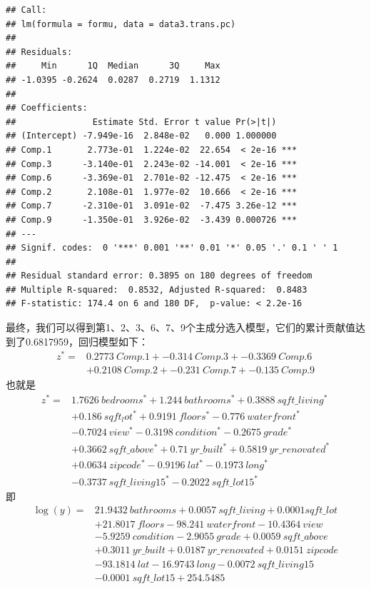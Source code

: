 \documentclass[]{article}
\begin{document}
\begin{verbatim}
## Call:
## lm(formula = formu, data = data3.trans.pc)
## 
## Residuals:
##     Min      1Q  Median      3Q     Max 
## -1.0395 -0.2624  0.0287  0.2719  1.1312 
## 
## Coefficients:
##               Estimate Std. Error t value Pr(>|t|)    
## (Intercept) -7.949e-16  2.848e-02   0.000 1.000000    
## Comp.1       2.773e-01  1.224e-02  22.654  < 2e-16 ***
## Comp.3      -3.140e-01  2.243e-02 -14.001  < 2e-16 ***
## Comp.6      -3.369e-01  2.701e-02 -12.475  < 2e-16 ***
## Comp.2       2.108e-01  1.977e-02  10.666  < 2e-16 ***
## Comp.7      -2.310e-01  3.091e-02  -7.475 3.26e-12 ***
## Comp.9      -1.350e-01  3.926e-02  -3.439 0.000726 ***
## ---
## Signif. codes:  0 '***' 0.001 '**' 0.01 '*' 0.05 '.' 0.1 ' ' 1
## 
## Residual standard error: 0.3895 on 180 degrees of freedom
## Multiple R-squared:  0.8532, Adjusted R-squared:  0.8483 
## F-statistic: 174.4 on 6 and 180 DF,  p-value: < 2.2e-16
\end{verbatim}

最终，我们可以得到第1、2、3、6、7、9个主成分选入模型，它们的累计贡献值达到了0.6817959，回归模型如下：
\begin{align*}
z^* = & 0.2773\ Comp.1 + -0.314\ Comp.3 + -0.3369\ Comp.6 \\
& + 0.2108\ Comp.2 + -0.231\ Comp.7 + -0.135\ Comp.9
\end{align*}
也就是
\begin{align*}
z^* = & 1.7626\ bedrooms^* + 1.244\ bathrooms^* + 0.3888\ sqft\_living^* \\
& + 0.186\ sqft_lot^* + 0.9191\ floors^* -0.776\ waterfront^* \\
& -0.7024\ view^* -0.3198\ condition^* -0.2675\ grade^* \\
& + 0.3662\ sqft\_above^* + 0.71\ yr\_built^* + 0.5819\ yr\_renovated^* \\
& + 0.0634\ zipcode^* -0.9196\ lat^* -0.1973\ long^*  \\
& -0.3737\ sqft\_living15^* -0.2022\ sqft\_lot15^*
\end{align*}
即
\begin{align*}
\log{(y)} = & 21.9432\ bathrooms + 0.0057\ sqft\_living + 0.0001 sqft\_lot \\
& + 21.8017\ floors -98.241\ waterfront -10.4364\ view \\
& -5.9259\ condition -2.9055\ grade + 0.0059\ sqft\_above \\
& + 0.3011\ yr\_built + 0.0187\ yr\_renovated + 0.0151\ zipcode\\
& -93.1814\ lat -16.9743\ long -0.0072\ sqft\_living15 \\
& -0.0001\ sqft\_lot15 + 254.5485
\end{align*}
\end{document}
